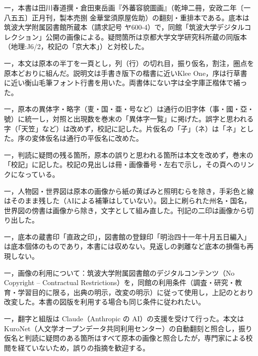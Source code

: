 
一，本書は田川春道撰・倉田東岳画『外蕃容貌圖画』（乾坤二冊，安政二年〔一八五五〕正月刊，製本売捌 金華堂須原屋佐助）の翻刻・重排本である。底本は筑波大学附属図書館所蔵本（請求記号 ヤ600-4）で，同館「筑波大学デジタルコレクション」公開の画像による。疑問箇所は京都大学文学研究科所蔵の同版本（地理:J6/2，校記の「京大本」）と対校した。

一，本文は原本の半丁を一頁とし，列（行）の切れ目，振り仮名，割注，圏点を原本どおりに組んだ。説明文は手書き版下の楷書に近いKlee One，序は行草書に近い衡山毛筆フォント行書を用いた。両書体にない字は全字庫正楷体で補った。

一，原本の異体字・略字（{\apxsung 叓}・国・亜・号など）は通行の旧字体（事・國・亞・號）に統一し，対照と出現数を巻末の「異体字一覧」に掲げた。誤字と思われる字（「天笠」など）は改めず，校記に記した。片仮名の「子」（ネ）は「ネ」とした。序の変体仮名は通行の平仮名に改めた。

一，判読に疑問の残る箇所，原本の誤りと思われる箇所は本文を改めず，巻末の「校記」に記した。校記の見出しは冊・画像番号・左右で示し，その頁へのリンクになっている。

一，人物図・世界図は原本の画像から紙の黄ばみと照明むらを除き，手彩色と線はそのまま残した（AIによる補筆はしていない）。図上に刷られた州名・国名，世界図の傍書は画像から除き，文字として組み直した。刊記の二印は画像から切り出した。

一，底本の蔵書印「直政之印」，図書館の登録印「明治四十一年十月五日編入」は底本個体のものであり，本書には収めない。見返しの剥離など底本の損傷も再現しない。

一，画像の利用について：筑波大学附属図書館のデジタルコンテンツ（No Copyright -- Contractual Restrictions）を，同館の利用条件（調査・研究・教育・学習目的に限る，出典の明示，改変の明示）に従って使用し，上記のとおり改変した。本書の図版を利用する場合も同じ条件に従われたい。

一，翻字と組版は Claude（Anthropic の AI）の支援を受けて行った。本文は KuroNet（人文学オープンデータ共同利用センター）の自動翻刻と照合し，振り仮名と判読に疑問のある箇所はすべて原本の画像と照合したが，専門家による校閲を経ていないため，誤りの指摘を歓迎する。
